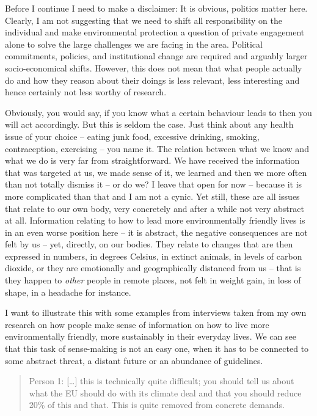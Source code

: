 ﻿\documentclass[a4paper,
fontsize=11pt,
oneside,
numbers=noperiodatend,
parskip=half-,
bibliography=totoc,
final
]{scrartcl}
\begin{document}
Before I continue I need to make a disclaimer: It is obvious, politics
matter here. Clearly, I am not suggesting that we need to shift all
responsibility on the individual and make environmental protection a
question of private engagement alone to solve the large challenges we
are facing in the area. Political commitments, policies, and
institutional change are required and arguably larger socio-economical
shifts. However, this does not mean that what people actually do and how
they reason about their doings is less relevant, less interesting and
hence certainly not less worthy of research.

Obviously, you would say, if you know what a certain behaviour leads to
then you will act accordingly. But this is seldom the case. Just think
about any health issue of your choice -- eating junk food, excessive
drinking, smoking, contraception, exercising -- you name it. The
relation between what we know and what we do is very far from
straightforward. We have received the information that was targeted at
us, we made sense of it, we learned and then we more often than not
totally dismiss it -- or do we? I leave that open for now -- because it
is more complicated than that and I am not a cynic. Yet still, these are
all issues that relate to our own body, very concretely and after a
while not very abstract at all. Information relating to how to lead more
environmentally friendly lives is in an even worse position here -- it
is abstract, the negative consequences are not felt by us -- yet,
directly, on our bodies. They relate to changes that are then expressed
in numbers, in degrees Celsius, in extinct animals, in levels of carbon
dioxide, or they are emotionally and geographically distanced from us --
that is they happen to \emph{other} people in remote places, not felt in
weight gain, in loss of shape, in a headache for instance.

I want to illustrate this with some examples from interviews taken from
my own research on how people make sense of information on how to live
more environmentally friendly, more sustainably in their everyday lives.
We can see that this task of sense-making is not an easy one, when it
has to be connected to some abstract threat, a distant future or an
abundance of guidelines.

\begin{quote}
Person 1: {[}\ldots{}{]} this is technically quite difficult; you should
tell us about what the EU should do with its climate deal and that you
should reduce 20\% of this and that. This is quite removed from concrete
demands.
\end{quote}
\end{document}
